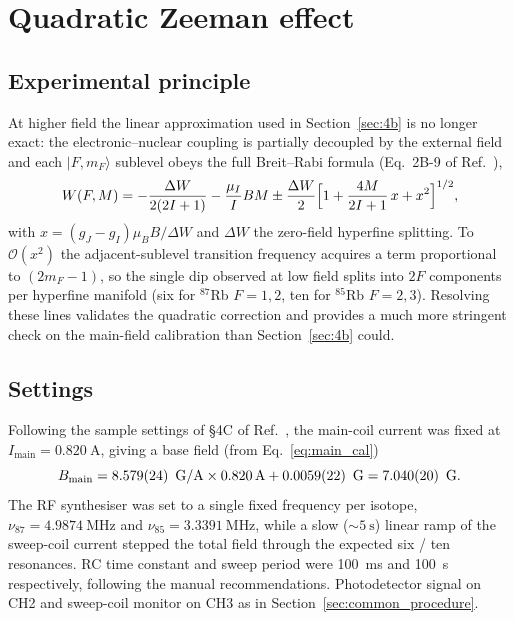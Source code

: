 \newpage
\section{Quadratic Zeeman effect}\label{sec:4c}

\subsection{Experimental principle}
At higher field the linear approximation used in Section~\ref{sec:4b} is no
longer exact: the electronic--nuclear coupling is partially decoupled by
the external field and each $|F,m_F\rangle$ sublevel obeys the full
Breit--Rabi formula (Eq.~2B-9 of Ref.~\cite{OpticalPumpingRubidium2002}),
\begin{equation}
  W(F,M) = -\frac{\Delta W}{2(2I+1)} - \frac{\mu_I}{I}BM
           \pm \frac{\Delta W}{2}\Bigl[1 + \frac{4M}{2I+1}\,x + x^2\Bigr]^{1/2},
  \label{eq:breit_rabi}
\end{equation}
with $x = (g_J - g_I)\mu_B B/\Delta W$ and $\Delta W$ the zero-field
hyperfine splitting. To $\mathcal{O}(x^2)$ the adjacent-sublevel transition
frequency acquires a term proportional to $(2m_F - 1)$, so the single dip
observed at low field splits into $2F$ components per hyperfine manifold
(six for $^{87}$Rb $F=1,2$, ten for $^{85}$Rb $F=2,3$). Resolving these
lines validates the quadratic correction and provides a much more stringent
check on the main-field calibration than Section~\ref{sec:4b} could.

\subsection{Settings}
Following the sample settings of §4C of
Ref.~\cite{OpticalPumpingRubidium2002}, the main-coil current was fixed at
$I_{\mathrm{main}} = \SI{0.820}{\ampere}$, giving a base field (from
Eq.~\ref{eq:main_cal})
\[
  B_{\mathrm{main}}
  = 8.579(24)\,\si{\gauss\per\ampere}\times\SI{0.820}{\ampere}
  + 0.0059(22)\,\si{\gauss}
  = 7.040(20)\,\si{\gauss}.
\]
The RF synthesiser was set to a single fixed frequency per isotope,
$\nu_{87} = \SI{4.9874}{\mega\hertz}$ and $\nu_{85} = \SI{3.3391}{\mega\hertz}$,
while a slow (${\sim}\SI{5}{\second}$) linear ramp of the sweep-coil
current stepped the total field through the expected six / ten
resonances. RC time constant and sweep period were \SI{100}{\milli\second}
and \SI{100}{\second} respectively, following the manual recommendations.
Photodetector signal on CH2 and sweep-coil monitor on CH3 as in
Section~\ref{sec:common_procedure}.

